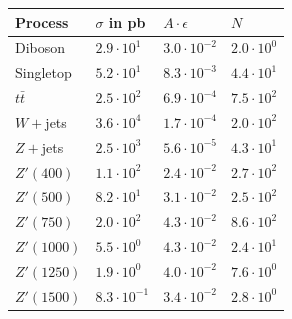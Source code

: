 \begin{table}[H]
 \begin{tabular}{l|l|l|l}
 Process & $\sigma$ in pb& $A\cdot \epsilon$ & $N$\\
 \hline
Diboson &$2.9\cdot 10^{1}$&$3.0\cdot 10^{-2}$ &$2.0\cdot 10^{0}$ \\
Singletop&$5.2\cdot 10^{1}$&$8.3\cdot 10^{-3}$ &$4.4\cdot 10^{1}$\\
$t\bar t$&$2.5\cdot 10^{2}$&$6.9\cdot 10^{-4}$ &$7.5\cdot 10^{2}$\\
$W+$jets&$3.6\cdot 10^{4}$&$1.7\cdot 10^{-4}$ &$2.0\cdot 10^{2}$\\
$Z+$jets&$2.5\cdot 10^{3}$&$5.6\cdot 10^{-5}$ &$4.3\cdot 10^{1}$\\
\hline
$Z'(400)$&$1.1\cdot 10^{2}$&$2.4\cdot 10^{-2}$ &$2.7\cdot 10^{2}$\\
$Z'(500)$&$8.2\cdot 10^{1}$&$3.1\cdot 10^{-2}$ &$2.5\cdot 10^{2}$\\
$Z'(750)$&$2.0\cdot 10^{2}$&$4.3\cdot 10^{-2}$ &$8.6\cdot 10^{2}$\\
$Z'(1000)$&$5.5\cdot 10^{0}$&$4.3\cdot 10^{-2}$ &$2.4\cdot 10^{1}$\\
$Z'(1250)$&$1.9\cdot 10^{0}$&$4.0\cdot 10^{-2}$ &$7.6\cdot 10^{0}$\\
$Z'(1500)$&$8.3\cdot 10^{-1}$&$3.4\cdot 10^{-2}$ &$2.8\cdot 10^{0}$\\

\end{tabular}
\end{table}
